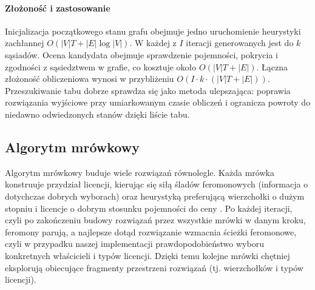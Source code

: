\paragraph{Złożoność i zastosowanie}
Inicjalizacja początkowego stanu grafu obejmuje jedno uruchomienie heurystyki zachłannej \(O(|V|T + |E|\log |V|)\). W każdej z \(I\) iteracji generowanych jest do \(k\) sąsiadów. Ocena kandydata obejmuje sprawdzenie pojemności, pokrycia i zgodności z sąsiedztwem w grafie, co kosztuje około \(O(|V|T + |E|)\). Łączna złożoność obliczeniowa wynosi w przybliżeniu \(O\!\left(I \cdot k \cdot (|V|T + |E|)\right)\). Przeszukiwanie tabu dobrze sprawdza się jako metoda ulepszająca: poprawia rozwiązania wyjściowe przy umiarkowanym czasie obliczeń i ogranicza powroty do niedawno odwiedzonych stanów dzięki liście tabu.

\subsection{Algorytm mrówkowy}\label{subsec:aco}
Algorytm mrówkowy buduje wiele rozwiązań równolegle. Każda mrówka konstruuje przydział licencji, kierując się siłą śladów feromonowych (informacja o dotychczas dobrych wyborach) oraz heurystyką preferującą wierzchołki o dużym stopniu i licencje o dobrym stosunku pojemności do ceny \cite{dorigo1997}. Po każdej iteracji, czyli po zakończeniu budowy rozwiązań przez wszystkie mrówki w danym kroku, feromony parują, a najlepsze dotąd rozwiązanie wzmacnia ścieżki feromonowe, czyli w przypadku naszej implementacji prawdopodobieństwo wyboru konkretnych właścicieli i typów licencji.
Dzięki temu kolejne mrówki chętniej eksplorują obiecujące fragmenty przestrzeni rozwiązań (tj. wierzchołków i typów licencji).
